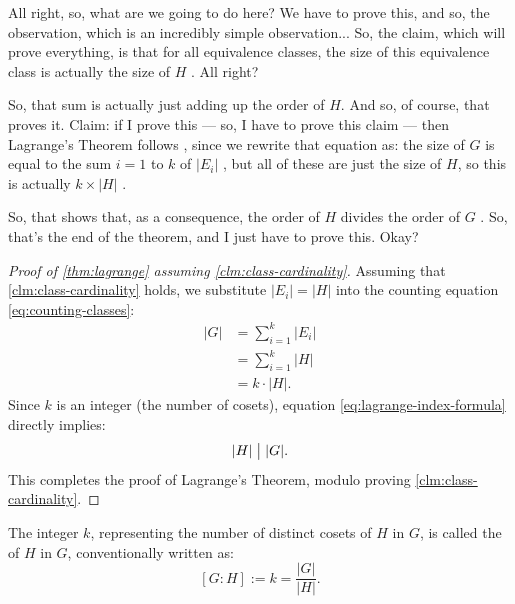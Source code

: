 \begin{speech}[00:21:22 - 00:22:28]
All right, so, what are we going to do here? We have to prove this, and so, the observation, which is an incredibly simple observation... So, the claim, which will prove everything, is that for all equivalence classes, the size of this equivalence class is actually the size of $H$ . All right?

So, that sum is actually just adding up the order of $H$. And so, of course, that proves it. Claim: if I prove this --- so, I have to prove this claim --- then Lagrange's Theorem follows , since we rewrite that equation as: the size of $G$ is equal to the sum $i=1$ to $k$ of $|E_i|$ , but all of these are just the size of $H$, so this is actually $k \times |H|$ .

So, that shows that, as a consequence, the order of $H$ divides the order of $G$ . So, that's the end of the theorem, and I just have to prove this. Okay?
\end{speech}

\begin{content}

\begin{proof}[Proof of \cref{thm:lagrange} assuming \cref{clm:class-cardinality}]
Assuming that \cref{clm:class-cardinality} holds, we substitute $|E_i| = |H|$ into the counting equation \eqref{eq:counting-classes}:
\begin{align}
|G| &= \sum_{i=1}^k |E_i| \nonumber \\
    &= \sum_{i=1}^k |H| \nonumber \\
    &= k \cdot |H|. \label{eq:lagrange-index-formula}
\end{align}
Since $k$ is an integer (the number of cosets), equation \eqref{eq:lagrange-index-formula} directly implies:
\[
|H| \bigm| |G|.
\]
This completes the proof of Lagrange's Theorem, modulo proving \cref{clm:class-cardinality}.
\end{proof}

\begin{steps}
The integer $k$, representing the number of distinct cosets of $H$ in $G$, is called the  of $H$ in $G$, conventionally written as:
\[
[G : H] := k = \frac{|G|}{|H|}.
\]
\end{steps}
\end{content}

